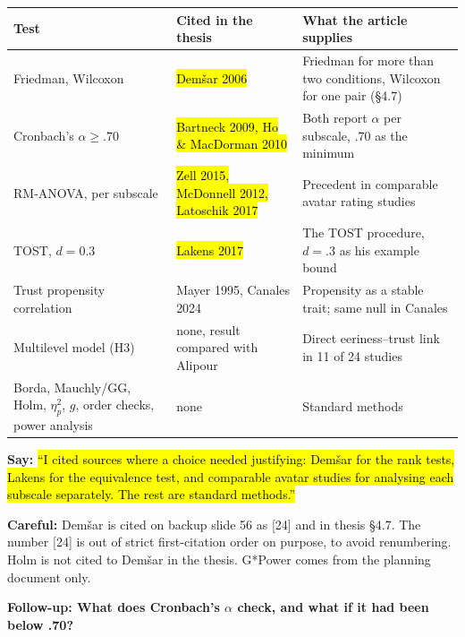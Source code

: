 \documentclass[11pt,a4paper]{article}
\newcommand{\key}[1]{\hl{#1}}
\newcommand{\say}[1]{\begin{tcolorbox}[colback=knlight,colframe=knblue,boxrule=0.5pt,left=6pt,right=6pt,top=4pt,bottom=4pt]\textbf{Say:} #1\end{tcolorbox}}
\newcommand{\careful}[1]{{\color{knred}\textbf{Careful:} #1}\par}
\begin{document}
{\small
\renewcommand{\arraystretch}{1.18}
\begin{tabular}{@{}>{\raggedright\arraybackslash}p{}>{\raggedright\arraybackslash}p{}>{\raggedright\arraybackslash}p{}@{}}
\toprule
\textbf{Test} & \textbf{Cited in the thesis} & \textbf{What the article supplies} \\
\midrule
Friedman, Wilcoxon & \key{Demšar 2006} & Friedman for more than two conditions, Wilcoxon for one pair (§4.7) \\
Cronbach's $\alpha\geq.70$ & \key{Bartneck 2009, Ho \& MacDorman 2010} & Both report $\alpha$ per subscale, .70 as the minimum \\
RM-ANOVA, per subscale & \key{Zell 2015, McDonnell 2012, Latoschik 2017} & Precedent in comparable avatar rating studies \\
TOST, $d=0.3$ & \key{Lakens 2017} & The TOST procedure, $d=.3$ as his example bound \\
Trust propensity correlation & Mayer 1995, Canales 2024 & Propensity as a stable trait; same null in Canales \\
Multilevel model (H3) & none, result compared with Alipour & Direct eeriness--trust link in 11 of 24 studies \\
Borda, Mauchly/GG, Holm, $\eta^2_p$, $g$, order checks, power analysis & none & Standard methods \\
\bottomrule
\end{tabular}\par}
\vspace{0.3em}
\say{\key{``I cited sources where a choice needed justifying: Demšar for the rank tests, Lakens for the equivalence test, and comparable avatar studies for analysing each subscale separately. The rest are standard methods.''}}
\careful{Demšar is cited on backup slide 56 as [24] and in thesis §4.7. The number [24] is out of strict first-citation order on purpose, to avoid renumbering. Holm is not cited to Demšar in the thesis. G*Power comes from the planning document only.}

{\bfseries\color{knblue}Follow-up: What does Cronbach's $\alpha$ check, and what if it had been below .70?}\par\vspace{0.2em}
\end{document}
